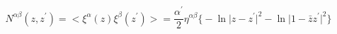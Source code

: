 \begin{equation}
N^{\alpha\beta}(z,z^\prime)=<\xi^\alpha(z)\xi^\beta(z^\prime)>=
\frac{\alpha^\prime}{2}\eta^{\alpha\beta}\bigl\lbrace-\ln\vert
z-z^\prime\vert^2-\ln\vert 1-\bar zz^\prime\vert^2\bigr\rbrace
\end{equation}

